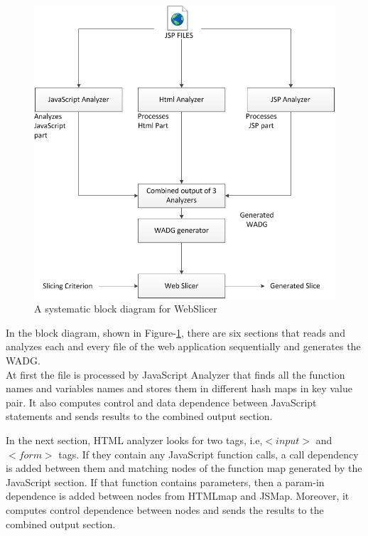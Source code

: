 \documentclass[11pt]{article}   %
\begin{document}
\begin{figure}
\begin{center}
\includegraphics[scale=.8]{sdgflowchart.png}
\caption{A systematic block diagram for WebSlicer}
\label{fig7}
\end{center}
\end{figure}

In the block diagram, shown in Figure-\ref{fig7}, there are six sections that reads and analyzes each and every file of the web application sequentially and generates the WADG.\\At first the file is processed by JavaScript Analyzer that finds all the function names and variables names and stores them in different hash maps in key value pair. It also computes control and data dependence between JavaScript statements and sends results to the combined output section.

In the next section, HTML analyzer looks for two tags, i.e,$<input>$ and $<form>$ tags. If they contain any JavaScript function calls, a call dependency is added between them and matching nodes of the function map generated by the JavaScript section. If that function contains parameters, then a param-in dependence is added between nodes from HTMLmap and JSMap. Moreover, it computes control dependence between nodes and sends the results to the combined output section.
\end{document}
